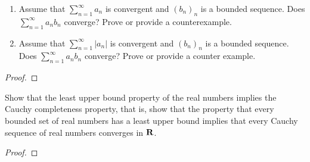 \documentclass[11pt,twoside,openany]{memoir}
\begin{document}
\renewcommand{\qedsymbol}{}
\newpage 
\fancyhead[L]{\scalebox{0.9}{Sequences}}
\fancyhead[R]{\scalebox{0.9}{Appeared on: S14}}
\begin{problem}
    \phantom{a}
    \begin{enumerate}[label = (\arabic*),itemsep=1pt,topsep=3pt]
        \item Assume that $\sum_{n = 1}^\infty a_n$ is convergent and $(b_n)_n$ is a bounded sequence. Does $\sum_{n = 1}^\infty a_n b_n$ converge? Prove or provide a counterexample.
        \item Assume that $\sum_{n = 1}^\infty \left| a_n \right|$ is convergent and $(b_n)_n$ is a bounded sequence. Does $\sum_{n = 1}^\infty a_n b_n$ converge? Prove or provide a counter example.
    \end{enumerate}
\end{problem}
\begin{proof}
\end{proof}

\newpage 
\fancyhead[L]{\scalebox{0.9}{Sequences}}
\fancyhead[R]{\scalebox{0.9}{Appeared on: S15}}
\begin{problem}
    Show that the least upper bound property of the real numbers implies the Cauchy completeness property, that is, show that the property that every bounded set of real numbers has a least upper bound implies that every Cauchy sequence of real numbers converges in $\mathbf{R}$.
\end{problem}
\begin{proof}
\end{proof}
\end{document}
